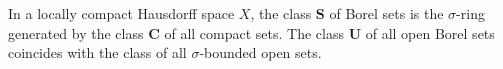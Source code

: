 In a locally compact Hausdorff space $X$, the class $\mathbf{S}$ of Borel sets is the $\sigma$-ring generated by the class $\mathbf{C}$ of all compact sets. The class $\mathbf{U}$ of all open Borel sets coincides with the class of all $\sigma$-bounded open sets.
